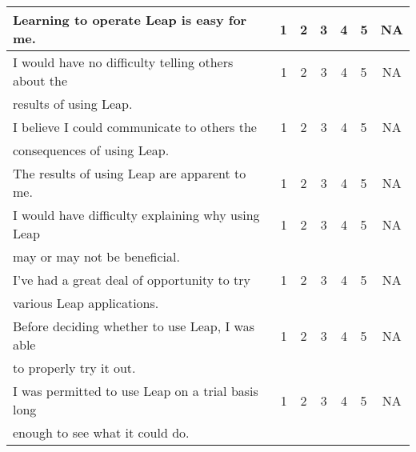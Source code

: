 \documentclass[11pt,times,dissertation,proposal]{uhthesis2e}
\begin{document}
\begin{table}[htbp]
\begin{tabular}{lrccclc}
    Learning to operate Leap is easy for me.&1&2&3&4&5&NA\\ \hline \hline
    I would have no difficulty telling others about the &1&2&3&4&5&NA \\
    results of using Leap. \\ \hline
    I believe I could communicate to others the &1&2&3&4&5&NA \\
    consequences of using Leap. \\ \hline
    The results of using Leap are apparent to me.&1&2&3&4&5&NA\\ \hline
    I would have difficulty explaining why using Leap &1&2&3&4&5&NA\\
    may or may not be beneficial.\\ \hline \hline
    I've had a great deal of opportunity to try &1&2&3&4&5&NA\\
    various Leap applications. \\ \hline
    Before deciding whether to use Leap, I was able &1&2&3&4&5&NA\\
    to properly try it out.\\ \hline
    I was permitted to use Leap on a trial basis long &1&2&3&4&5&NA\\
    enough to see what it could do. \\ \hline
  \end{tabular}
\end{table}
\end{document}
